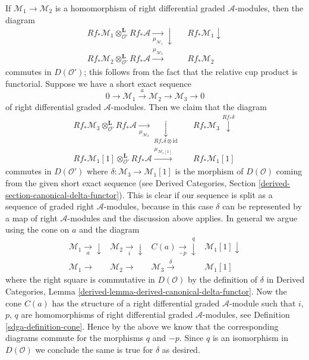 \medskip\noindent
If $\mathcal{M}_1 \to \mathcal{M}_2$ is a homomorphism of
right differential graded $\mathcal{A}$-modules, then the diagram
$$
\begin{array}{ccc}Rf_*\mathcal{M}_1 \otimes_{\mathcal{O}'}^\mathbf{L} Rf_*\mathcal{A}
\underset{\mu_{\mathcal{M}_1}}{\longrightarrow}\downarrow &  & Rf_*\mathcal{M}_1 \downarrow \\ Rf_*\mathcal{M}_2 \otimes_{\mathcal{O}'}^\mathbf{L} Rf_*\mathcal{A}
\overset{\mu_{\mathcal{M}_2}}{\longrightarrow} &  & Rf_*\mathcal{M}_2\end{array}
$$
commutes in $D(\mathcal{O}')$; this follows from the fact that the relative
cup product is functorial. Suppose we have a short exact sequence
$$
0 \to \mathcal{M}_1 \xrightarrow{a} \mathcal{M}_2 \to \mathcal{M}_3 \to 0
$$
of right differential graded $\mathcal{A}$-modules. Then we claim
that the diagram
$$
\begin{array}{ccc}Rf_*\mathcal{M}_3 \otimes_{\mathcal{O}'}^\mathbf{L} Rf_*\mathcal{A}
\underset{\mu_{\mathcal{M}_3}}{\longrightarrow}\underset{Rf_*\delta \otimes \text{id}}{\downarrow} &  & Rf_*\mathcal{M}_3 \overset{Rf_*\delta}{\downarrow} \\ Rf_*\mathcal{M}_1[1] \otimes_{\mathcal{O}'}^\mathbf{L} Rf_*\mathcal{A}
\overset{\mu_{\mathcal{M}_1[1]}}{\longrightarrow} &  & Rf_*\mathcal{M}_1[1]\end{array}
$$
commutes in $D(\mathcal{O}')$ where
$\delta : \mathcal{M}_3 \to \mathcal{M}_1[1]$ is the
morphism of $D(\mathcal{O})$ coming from the given
short exact sequence (see
Derived Categories, Section \ref{derived-section-canonical-delta-functor}).
This is clear if our sequence is split as a sequence of graded right
$\mathcal{A}$-modules, because in this case $\delta$ can be represented
by a map of right $\mathcal{A}$-modules and the discussion above applies.
In general we argue using the cone on $a$ and the diagram
$$
\begin{array}{cccc}\mathcal{M}_1 \underset{a}{\longrightarrow}\downarrow & \mathcal{M}_2 \underset{i}{\longrightarrow}\downarrow & C(a) \underset{-p}{\longrightarrow}\overset{q}{\downarrow} & \mathcal{M}_1[1] \downarrow \\ \mathcal{M}_1 \longrightarrow & \mathcal{M}_2 \longrightarrow & \mathcal{M}_3 \overset{\delta}{\longrightarrow} & \mathcal{M}_1[1]\end{array}
$$
where the right square is commutative in $D(\mathcal{O})$ by the definition of
$\delta$ in Derived Categories, Lemma
\ref{derived-lemma-derived-canonical-delta-functor}.
Now the cone $C(a)$ has the structure of a right differential graded
$\mathcal{A}$-module such that $i$, $p$, $q$ are homomorphisms of
right differential graded $\mathcal{A}$-modules, see
Definition \ref{sdga-definition-cone}.
Hence by the above we know that the corresponding
diagrams commute for the morphisms $q$ and $-p$.
Since $q$ is an isomorphism in $D(\mathcal{O})$ we conclude the
same is true for $\delta$ as desired.

